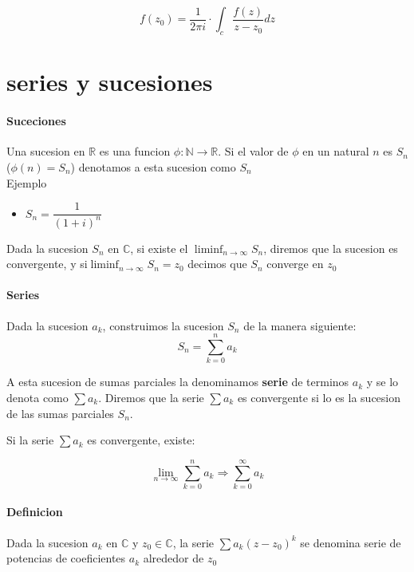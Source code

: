 \documentclass[10pt]{article}
\begin{document}
\begin{equation*}
	f(z_0) = \dfrac{1}{2\pi i} \cdot \int_c \dfrac{f(z)}{z-z_0}dz
\end{equation*}

\section{series y sucesiones}

\paragraph{Suceciones} Una sucesion  en $\mathbb{R}$ es una funcion $\phi : \mathbb{N}\rightarrow \mathbb{R}$. Si el valor de $\phi$ en un natural $n$ es $S_n$ ($\phi(n) = S_n$) denotamos a esta sucesion como ${S_n}$\\
\linebreak
Ejemplo
\begin{itemize}
	\item $S_n = \dfrac{1}{(1+i)^n}$ 
\end{itemize} 	

Dada la sucesion ${S_n}$ en $\mathbb{C}$, si existe el $\liminf_{n\rightarrow \infty} S_n$, diremos que la sucesion es convergente, y si$\liminf_{n\rightarrow \infty} S_n = z_0$ decimos que ${S_n}$ converge en $z_0$

\paragraph{Series} Dada la sucesion ${a_k}$, construimos la sucesion ${S_n}$ de la manera siguiente:
\begin{equation*}
	S_n = \sum_{k=0}^{n} a_k
\end{equation*}

A esta sucesion de sumas parciales la denominamos \textbf{serie} de terminos $a_k$ y se lo denota como $\sum a_k$. Diremos que la serie $\sum a_k$ es convergente si lo es la sucesion de las sumas parciales ${S_n}$.\\
\linebreak

Si la serie $\sum a_k$ es convergente, existe:

\begin{equation*}
	\lim_{n\rightarrow \infty} \sum_{k=0}^{n} a_k \Rightarrow \sum_{k=0}^{\infty} a_k
\end{equation*}

\paragraph{Definicion} Dada la sucesion ${a_k}$ en $\mathbb{C}$ y $z_0 \in \mathbb{C}$, la serie $\sum a_k (z-z_0)^k$ se denomina serie de potencias de coeficientes $a_k$ alrededor de $z_0$
\end{document}
